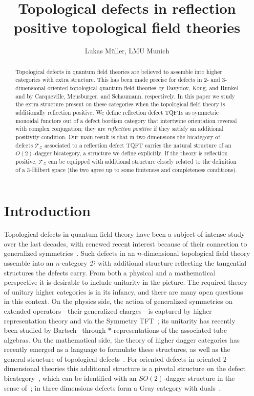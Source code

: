 \documentclass[11pt]{article}
\title{Topological defects in reflection positive topological field theories}
\author{Lukas Müller, LMU Munich}
\date{}
\theoremstyle{definition}
\newcommand{\cD}{\mathcal{D}}
\newcommand{\cT}{\mathcal{T}}
\newcommand{\cZ}{\mathcal{Z}}
\newcommand{\SO}{SO}
\newcommand{\Or}{O} %
\begin{document}
\maketitle

\begin{abstract} 
Topological defects in quantum field theories are believed to assemble into higher categories with extra structure. This has been made precise for defects in $2$- and $3$-dimensional oriented topological quantum field theories by Davydov, Kong, and Runkel and by Carqueville, Meusburger, and Schaumann, respectively. In this paper we study the extra structure present on these categories when the topological field theory is additionally reflection positive. We define reflection defect TQFTs as symmetric monoidal functors out of a defect bordism category that intertwine orientation reversal with complex conjugation; they are \emph{reflection positive} if they satisfy an additional positivity condition. Our main result is that in two dimensions the bicategory of defects $\cT_\cZ$ associated to a reflection defect TQFT carries the natural structure of an $\Or(2)$-dagger bicategory, a structure we define explicitly. If the theory is reflection positive, $\cT_\cZ$ can be equipped with additional structure closely related to the definition of a 3-Hilbert space (the two agree up to some finiteness and completeness conditions).
\end{abstract}

\tableofcontents

\section{Introduction}
\label{sec:Intro}
Topological defects in quantum field theory have been a subject of intense study over the last decades, with renewed recent interest because of their connection to generalized symmetries~\cite{BBFT24,CDIS22,FMT24,GKSW15,SN23,Sha23}. Such defects in an $n$-dimensional topological field theory assemble into an $n$-category $\cD$ with additional structure reflecting the tangential structures the defects carry. From both a physical and a mathematical perspective it is desirable to include unitarity in the picture. The required theory of unitary higher categories is in its infancy, and there are many open questions in this context. On the physics side, the action of generalized symmetries on extended operators---their generalized charges---is captured by higher representation theory and via the Symmetry TFT~\cite{BBG23a,BBG23b,BSN23a,BSN23b,CHFHS24}; its unitarity has recently been studied by Bartsch~\cite{Bar25} through $\ast$-representations of the associated tube algebras. On the mathematical side, the theory of higher dagger categories has recently emerged as a language to formulate these structures, as well as the general structure of topological defects~\cite{FHJF24, CL25, Mue25}. For oriented defects in oriented 2-dimensional theories this additional structure is a pivotal structure on the defect bicategory~\cite{DKR11,Car16}, which can be identified with an $\SO(2)$-dagger structure in the sense of~\cite{CL25, Mue25}; in three dimensions defects form a Gray category with duals~\cite{CMS}.
\end{document}
